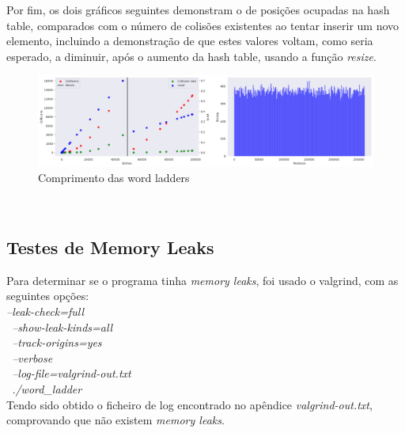 \documentclass[a4paper,11pt]{article}
\begin{document}
	Por fim, os dois gráficos seguintes demonstram o de posições ocupadas na hash table, comparados com o número de colisões existentes ao tentar inserir um novo elemento, incluindo a demonstração de que estes valores voltam, como seria esperado, a diminuir, após o aumento da hash table, usando a função \emph{resize}.\\
	\begin{figure}[h]
        \centering
        \includegraphics[width=\textwidth]{output_4_0}
        \caption{Comprimento das word ladders}\label{fig:graph-1}
    \end{figure}\\
		
	\subsection{Testes de Memory Leaks}
	Para determinar se o programa tinha \emph{memory leaks}, foi usado o valgrind, com as seguintes opções:\\
	\emph{--leak-check=full \\\
         --show-leak-kinds=all \\\
         --track-origins=yes \\\
         --verbose \\\
         --log-file=valgrind-out.txt \\\
         ./word\_ladder }\\
         Tendo sido obtido o ficheiro de log encontrado no apêndice \emph{valgrind-out.txt}, comprovando que não existem \emph{memory leaks}.
	
\end{document}
